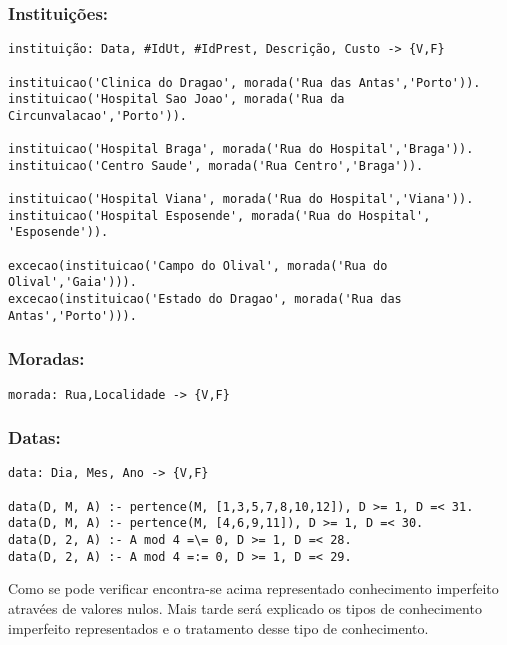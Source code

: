 \documentclass{report}
\begin{document}
\subsubsection{Instituições:}
\begin{verbatim}
instituição: Data, #IdUt, #IdPrest, Descrição, Custo -> {V,F}

instituicao('Clinica do Dragao', morada('Rua das Antas','Porto')).
instituicao('Hospital Sao Joao', morada('Rua da Circunvalacao','Porto')).

instituicao('Hospital Braga', morada('Rua do Hospital','Braga')).
instituicao('Centro Saude', morada('Rua Centro','Braga')).

instituicao('Hospital Viana', morada('Rua do Hospital','Viana')).
instituicao('Hospital Esposende', morada('Rua do Hospital', 'Esposende')).

excecao(instituicao('Campo do Olival', morada('Rua do Olival','Gaia'))).
excecao(instituicao('Estado do Dragao', morada('Rua das Antas','Porto'))).

\end{verbatim}

\subsubsection{Moradas:}
\begin{verbatim}
morada: Rua,Localidade -> {V,F}

\end{verbatim}

\subsubsection{Datas:}
\begin{verbatim}
data: Dia, Mes, Ano -> {V,F}

data(D, M, A) :- pertence(M, [1,3,5,7,8,10,12]), D >= 1, D =< 31.
data(D, M, A) :- pertence(M, [4,6,9,11]), D >= 1, D =< 30.
data(D, 2, A) :- A mod 4 =\= 0, D >= 1, D =< 28.
data(D, 2, A) :- A mod 4 =:= 0, D >= 1, D =< 29.
\end{verbatim}

Como se pode verificar encontra-se acima representado conhecimento imperfeito atravées de valores nulos. Mais tarde será explicado os tipos de conhecimento imperfeito representados e o tratamento desse tipo de conhecimento.
\end{document}
